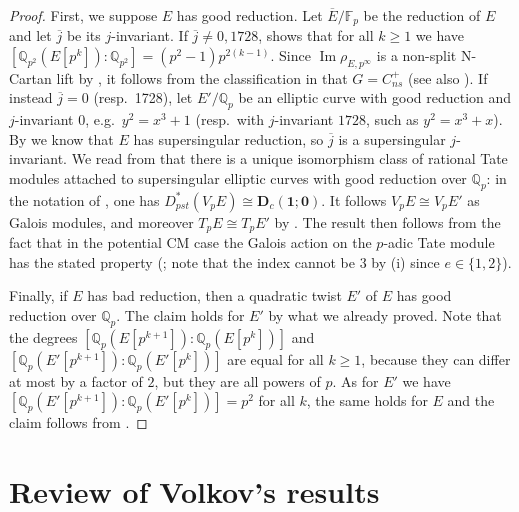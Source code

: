 \documentclass{amsart}
\theoremstyle{definition}
\newcommand{\Q}{\mathbb{Q}}
\numberwithin{theorem}{section}
\numberwithin{equation}{section}
\begin{document}
\begin{proof}
    First, we suppose $E$ has good reduction. Let $\overline{E}/\mathbb{F}_p$ be the reduction of $E$ and let $\overline{j}$ be its $j$-invariant. If $\overline{j} \neq 0, 1728$, \cite[Lemma 3.3(i)]{HabeggerSmallHeight} shows that for all $k \geq 1$ we have $[\mathbb{Q}_{p^2}(E[p^k]) : \mathbb{Q}_{p^2}] = (p^2-1)p^{2(k-1)}$. Since $\operatorname{Im} \rho_{E, p^\infty}$ is a non-split N-Cartan lift by , it follows from the classification in  that $G=C_{ns}^+$ (see also ). If instead $\overline{j} =0$ (resp.~1728), let $E'/\mathbb{Q}_p$ be an elliptic curve with good reduction and $j$-invariant $0$, e.g.~$y^2=x^3+1$ (resp.~with $j$-invariant $1728$, such as $y^2=x^3+x$). By  we know that $E$ has supersingular reduction, so $\overline{j}$ is a supersingular $j$-invariant. We read from \cite[Proposition 2.7]{VolkovArticle} that there is a unique isomorphism class of rational Tate modules attached to supersingular elliptic curves with good reduction over $\mathbb{Q}_p$: in the notation of \cite[\S 2.2.1]{VolkovArticle}, one has $D^*_{pst}(V_pE) \cong \mathbf{D}_c(\mathbf{1}; \mathbf{0})$. It follows $V_pE \cong V_pE'$ as Galois modules, and moreover $T_pE \cong T_pE'$ by \cite[\S B.2.2]{Volkov}. The result then follows from the fact that in the potential CM case the Galois action on the $p$-adic Tate module has the stated property (; note that the index cannot be 3 by (i) since $e \in \{1,2\}$).

    Finally, if $E$ has bad reduction, then a quadratic twist $E'$ of $E$ has good reduction over $\Q_p$. The claim holds for $E'$ by what we already proved. Note that the degrees $[\mathbb{Q}_p(E[p^{k+1}]) : \mathbb{Q}_p(E[p^{k}])]$ and $[\mathbb{Q}_p(E'[p^{k+1}]) : \mathbb{Q}_p(E'[p^{k}])]$ are equal for all $k \geq 1$, because they can differ at most by a factor of $2$, but they are all powers of $p$. As for $E'$ we have $[\mathbb{Q}_p(E'[p^{k+1}]) : \mathbb{Q}_p(E'[p^{k}])]=p^2$ for all $k$, the same holds for $E$ and the claim follows from .
\end{proof}


\section{Review of Volkov's results}\label{sect: Volkov results}
\end{document}
